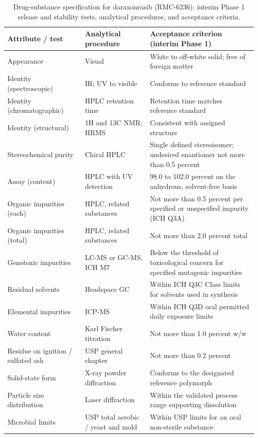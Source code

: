 \begin{table}[t]
\centering
\caption{Drug-substance specification for daraxonrasib (RMC-6236): interim
Phase 1 release and stability tests, analytical procedures, and acceptance
criteria.}
\label{tab:cmc-ds-spec}
\begin{tabularx}{\textwidth}{L{4.1cm} L{4.0cm} Y}
\toprule
\textbf{Attribute / test} & \textbf{Analytical procedure} & \textbf{Acceptance criterion (interim Phase 1)} \\
\midrule
Appearance & Visual & White to off-white solid; free of foreign matter \\
Identity (spectroscopic) & IR; UV to visible & Conforms to reference standard \\
Identity (chromatographic) & HPLC retention time & Retention time matches reference standard \\
Identity (structural) & 1H and 13C NMR; HRMS & Consistent with assigned structure \\
Stereochemical purity & Chiral HPLC & Single defined stereoisomer; undesired enantiomer not more than 0.5 percent \\
Assay (content) & HPLC with UV detection & 98.0 to 102.0 percent on the anhydrous, solvent-free basis \\
Organic impurities (each) & HPLC, related substances & Not more than 0.5 percent per specified or unspecified impurity (ICH Q3A) \\
Organic impurities (total) & HPLC, related substances & Not more than 2.0 percent total \\
Genotoxic impurities & LC-MS or GC-MS, ICH M7 & Below the threshold of toxicological concern for specified mutagenic impurities \\
Residual solvents & Headspace GC & Within ICH Q3C Class limits for solvents used in synthesis \\
Elemental impurities & ICP-MS & Within ICH Q3D oral permitted daily exposure limits \\
Water content & Karl Fischer titration & Not more than 1.0 percent w/w \\
Residue on ignition / sulfated ash & USP general chapter & Not more than 0.2 percent \\
Solid-state form & X-ray powder diffraction & Conforms to the designated reference polymorph \\
Particle size distribution & Laser diffraction & Within the validated process range supporting dissolution \\
Microbial limits & USP total aerobic / yeast and mold & Within USP limits for an oral non-sterile substance \\
\bottomrule
\end{tabularx}
\vspace*{-0.2cm}
\end{table}

